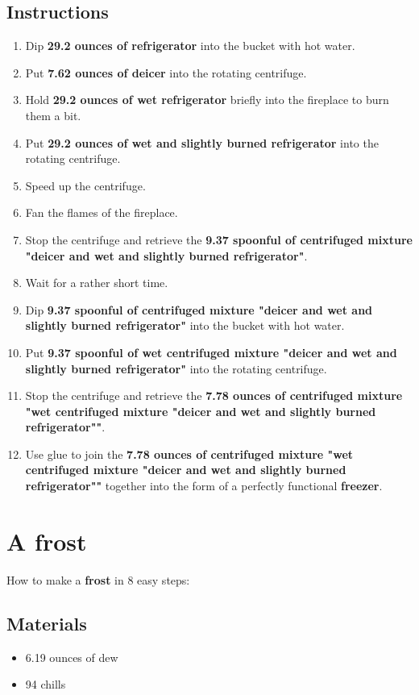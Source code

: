 \documentclass{article}
\begin{document}
\subsection{Instructions}\begin{enumerate}
\item 
Dip \textbf{29.2 ounces of refrigerator} into the bucket with hot water.
\item 
Put \textbf{7.62 ounces of deicer} into the rotating centrifuge.
\item 
Hold \textbf{29.2 ounces of wet refrigerator} briefly into the fireplace to burn them a bit.
\item 
Put \textbf{29.2 ounces of wet and slightly burned refrigerator} into the rotating centrifuge.
\item 
Speed up the centrifuge.
\item 
Fan the flames of the fireplace.
\item 
Stop the centrifuge and retrieve the \textbf{9.37 spoonful of centrifuged mixture "deicer and wet and slightly burned refrigerator"}.
\item 
Wait for a rather short time.
\item 
Dip \textbf{9.37 spoonful of centrifuged mixture "deicer and wet and slightly burned refrigerator"} into the bucket with hot water.
\item 
Put \textbf{9.37 spoonful of wet centrifuged mixture "deicer and wet and slightly burned refrigerator"} into the rotating centrifuge.
\item 
Stop the centrifuge and retrieve the \textbf{7.78 ounces of centrifuged mixture "wet centrifuged mixture "deicer and wet and slightly burned refrigerator""}.
\item 
Use glue to join the \textbf{7.78 ounces of centrifuged mixture "wet centrifuged mixture "deicer and wet and slightly burned refrigerator""} together into the form of a perfectly functional \textbf{freezer}.
\end{enumerate}
\newpage
\section{A frost}How to make a \textbf{frost} in 8 easy steps:

\subsection{Materials}\begin{itemize}
\item 
6.19 ounces of dew
\item 
94 chills
\end{itemize}
\end{document}
